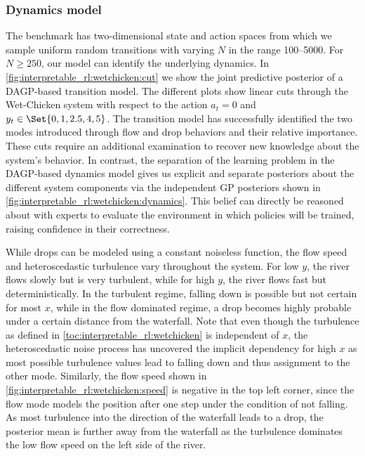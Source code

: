 \subsubsection{Dynamics model}
\label{toc:interpretable_rl:dynamics_model}
The benchmark has two-dimensional state and action spaces from which we sample uniform random transitions with varying $N$ in the range \numrange{100}{5000}.
For $N \geq 250$, our model can identify the underlying dynamics.
In \cref{fig:interpretable_rl:wetchicken:cut} we show the joint predictive posterior of a DAGP-based transition model.
The different plots show linear cuts through the Wet-Chicken system with respect to the action $a_t = 0$ and $y_t \in \Set{0, 1, 2.5, 4, 5}$.
The transition model has successfully identified the two modes introduced through flow and drop behaviors and their relative importance.
These cuts require an additional examination to recover new knowledge about the system's behavior.
In contrast, the separation of the learning problem in the DAGP-based dynamics model gives us explicit and separate posteriors about the different system components via the independent GP posteriors shown in \cref{fig:interpretable_rl:wetchicken:dynamics}.
This belief can directly be reasoned about with experts to evaluate the environment in which policies will be trained, raising confidence in their correctness.

While drops can be modeled using a constant noiseless function, the flow speed and heteroscedastic turbulence vary throughout the system.
For low $y$, the river flows slowly but is very turbulent, while for high $y$, the river flows fast but deterministically.
In the turbulent regime, falling down is possible but not certain for most $x$, while in the flow dominated regime, a drop becomes highly probable under a certain distance from the waterfall.
Note that even though the turbulence as defined in \cref{toc:interpretable_rl:wetchicken} is independent of $x$, the heteroscedastic noise process has uncovered the implicit dependency for high $x$ as most possible turbulence values lead to falling down and thus assignment to the other mode.
Similarly, the flow speed shown in \cref{fig:interpretable_rl:wetchicken:speed} is negative in the top left corner, since the flow mode models the position after one step under the condition of not falling.
As most turbulence into the direction of the waterfall leads to a drop, the posterior mean is further away from the waterfall as the turbulence dominates the low flow speed on the left side of the river.


